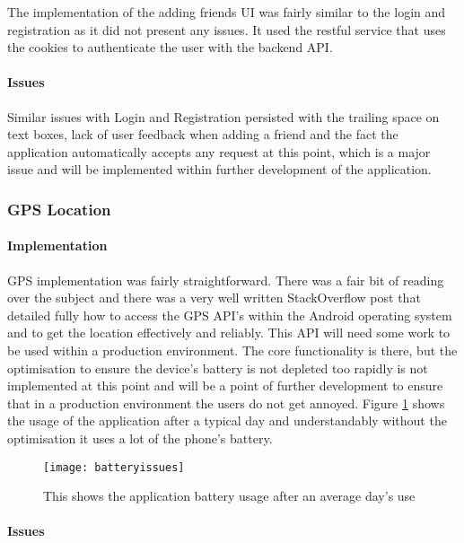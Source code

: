The implementation of the adding friends UI was fairly similar to the login and registration as it did not present any issues. It used the restful service that uses the cookies to authenticate the user with the backend API.

\paragraph*{Issues}

Similar issues with Login and Registration persisted with the trailing space on text boxes, lack of user feedback when adding a friend and the fact the application automatically accepts any request at this point, which is a major issue and will be implemented within further development of the application.


\subsubsection{GPS Location}

\paragraph*{Implementation}

GPS implementation was fairly straightforward. There was a fair bit of reading over the subject and there was a very well written StackOverflow post \cite{mudit:HowdoIgetthecurrentGPSlocationprogrammaticallyinAndroid:2009:online} that detailed fully how to access the GPS API's within the Android operating system and to get the location effectively and reliably. This API will need some work to be used within a production environment. The core functionality is there, but the optimisation to ensure the device's battery is not depleted too rapidly is not implemented at this point and will be a point of further development to ensure that in a production environment the users do not get annoyed. Figure \ref{fig:battery_issues} shows the usage of the application after a typical day and understandably without the optimisation it uses a lot of the phone's battery.

\begin{figure}[H]
    \centering
    \texttt{[image: batteryissues]}
    \caption{This shows the application battery usage after an average day's use}
    \label{fig:battery_issues}
\end{figure} 

\paragraph*{Issues}

